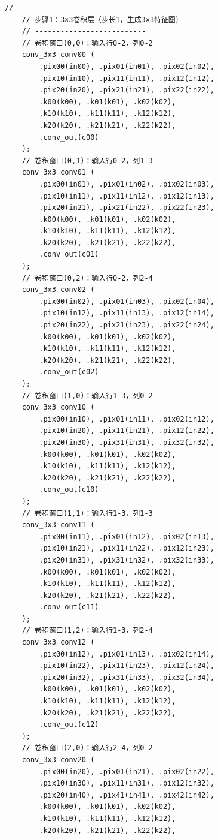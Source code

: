 \documentclass{ctexart}
\begin{document}
\begin{lstlisting}[style=verilog, caption=cnn\_top.v]
    // --------------------------
    // 步骤1：3×3卷积层（步长1，生成3×3特征图）
    // --------------------------
    // 卷积窗口(0,0)：输入行0-2，列0-2
    conv_3x3 conv00 (
        .pix00(in00), .pix01(in01), .pix02(in02),
        .pix10(in10), .pix11(in11), .pix12(in12),
        .pix20(in20), .pix21(in21), .pix22(in22),
        .k00(k00), .k01(k01), .k02(k02),
        .k10(k10), .k11(k11), .k12(k12),
        .k20(k20), .k21(k21), .k22(k22),
        .conv_out(c00)
    );
    // 卷积窗口(0,1)：输入行0-2，列1-3
    conv_3x3 conv01 (
        .pix00(in01), .pix01(in02), .pix02(in03),
        .pix10(in11), .pix11(in12), .pix12(in13),
        .pix20(in21), .pix21(in22), .pix22(in23),
        .k00(k00), .k01(k01), .k02(k02),
        .k10(k10), .k11(k11), .k12(k12),
        .k20(k20), .k21(k21), .k22(k22),
        .conv_out(c01)
    );
    // 卷积窗口(0,2)：输入行0-2，列2-4
    conv_3x3 conv02 (
        .pix00(in02), .pix01(in03), .pix02(in04),
        .pix10(in12), .pix11(in13), .pix12(in14),
        .pix20(in22), .pix21(in23), .pix22(in24),
        .k00(k00), .k01(k01), .k02(k02),
        .k10(k10), .k11(k11), .k12(k12),
        .k20(k20), .k21(k21), .k22(k22),
        .conv_out(c02)
    );
    // 卷积窗口(1,0)：输入行1-3，列0-2
    conv_3x3 conv10 (
        .pix00(in10), .pix01(in11), .pix02(in12),
        .pix10(in20), .pix11(in21), .pix12(in22),
        .pix20(in30), .pix31(in31), .pix32(in32),
        .k00(k00), .k01(k01), .k02(k02),
        .k10(k10), .k11(k11), .k12(k12),
        .k20(k20), .k21(k21), .k22(k22),
        .conv_out(c10)
    );
    // 卷积窗口(1,1)：输入行1-3，列1-3
    conv_3x3 conv11 (
        .pix00(in11), .pix01(in12), .pix02(in13),
        .pix10(in21), .pix11(in22), .pix12(in23),
        .pix20(in31), .pix31(in32), .pix32(in33),
        .k00(k00), .k01(k01), .k02(k02),
        .k10(k10), .k11(k11), .k12(k12),
        .k20(k20), .k21(k21), .k22(k22),
        .conv_out(c11)
    );
    // 卷积窗口(1,2)：输入行1-3，列2-4
    conv_3x3 conv12 (
        .pix00(in12), .pix01(in13), .pix02(in14),
        .pix10(in22), .pix11(in23), .pix12(in24),
        .pix20(in32), .pix31(in33), .pix32(in34),
        .k00(k00), .k01(k01), .k02(k02),
        .k10(k10), .k11(k11), .k12(k12),
        .k20(k20), .k21(k21), .k22(k22),
        .conv_out(c12)
    );
    // 卷积窗口(2,0)：输入行2-4，列0-2
    conv_3x3 conv20 (
        .pix00(in20), .pix01(in21), .pix02(in22),
        .pix10(in30), .pix11(in31), .pix12(in32),
        .pix20(in40), .pix41(in41), .pix42(in42),
        .k00(k00), .k01(k01), .k02(k02),
        .k10(k10), .k11(k11), .k12(k12),
        .k20(k20), .k21(k21), .k22(k22),

\end{lstlisting}
\end{document}
